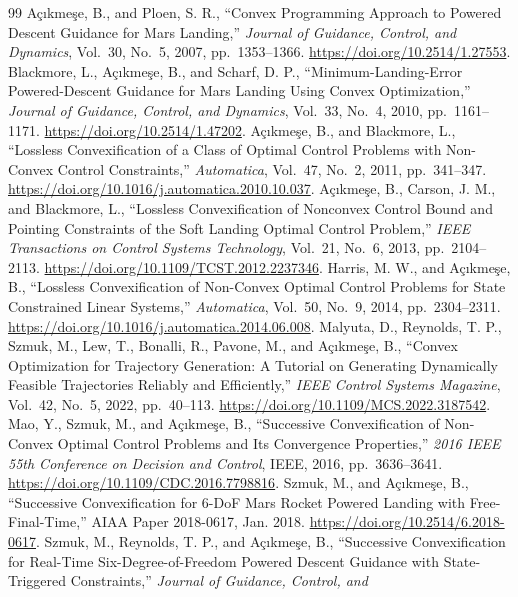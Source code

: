 \begin{thebibliography}{99}
 A\c{c}{\i}kme\c{s}e, B., and Ploen, S. R., ``Convex Programming Approach to Powered Descent Guidance for Mars
Landing,'' \emph{Journal of Guidance, Control, and Dynamics}, Vol.~30, No.~5, 2007, pp.~1353--1366. \url{https://doi.org/10.2514/1.27553}.
 Blackmore, L., A\c{c}{\i}kme\c{s}e, B., and Scharf, D. P., ``Minimum-Landing-Error Powered-Descent Guidance for
Mars Landing Using Convex Optimization,'' \emph{Journal of Guidance, Control, and Dynamics}, Vol.~33, No.~4, 2010, pp.~1161--1171.
\url{https://doi.org/10.2514/1.47202}.
 A\c{c}{\i}kme\c{s}e, B., and Blackmore, L., ``Lossless Convexification of a Class of Optimal Control Problems
with Non-Convex Control Constraints,'' \emph{Automatica}, Vol.~47, No.~2, 2011, pp.~341--347. \url{https://doi.org/10.1016/j.automatica.2010.10.037}.
 A\c{c}{\i}kme\c{s}e, B., Carson, J. M., and Blackmore, L., ``Lossless Convexification of Nonconvex Control Bound
and Pointing Constraints of the Soft Landing Optimal Control Problem,'' \emph{IEEE Transactions on Control Systems Technology},
Vol.~21, No.~6, 2013, pp.~2104--2113. \url{https://doi.org/10.1109/TCST.2012.2237346}.
 Harris, M. W., and A\c{c}{\i}kme\c{s}e, B., ``Lossless Convexification of Non-Convex Optimal Control Problems for
State Constrained Linear Systems,'' \emph{Automatica}, Vol.~50, No.~9, 2014, pp.~2304--2311. \url{https://doi.org/10.1016/j.automatica.2014.06.008}.
 Malyuta, D., Reynolds, T. P., Szmuk, M., Lew, T., Bonalli, R., Pavone, M., and A\c{c}{\i}kme\c{s}e, B., ``Convex
Optimization for Trajectory Generation: A Tutorial on Generating Dynamically Feasible Trajectories Reliably and Efficiently,''
\emph{IEEE Control Systems Magazine}, Vol.~42, No.~5, 2022, pp.~40--113. \url{https://doi.org/10.1109/MCS.2022.3187542}.
 Mao, Y., Szmuk, M., and A\c{c}{\i}kme\c{s}e, B., ``Successive Convexification of Non-Convex Optimal Control Problems
and Its Convergence Properties,'' \emph{2016 IEEE 55th Conference on Decision and Control}, IEEE, 2016, pp.~3636--3641.
\url{https://doi.org/10.1109/CDC.2016.7798816}.
 Szmuk, M., and A\c{c}{\i}kme\c{s}e, B., ``Successive Convexification for 6-DoF Mars Rocket Powered Landing with
Free-Final-Time,'' AIAA Paper 2018-0617, Jan. 2018. \url{https://doi.org/10.2514/6.2018-0617}.
 Szmuk, M., Reynolds, T. P., and A\c{c}{\i}kme\c{s}e, B., ``Successive Convexification for Real-Time
Six-Degree-of-Freedom Powered Descent Guidance with State-Triggered Constraints,'' \emph{Journal of Guidance, Control, and
}
\end{thebibliography}
